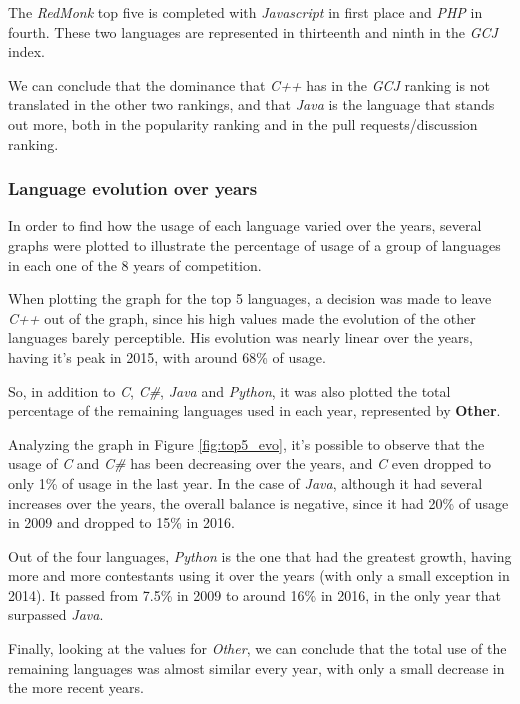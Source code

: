 \documentclass{article}
\begin{document}
\begin{multicols*}{2}
The \textit{RedMonk} top five is completed with \textit{Javascript} in first place and \textit{PHP} in fourth. These two languages are represented in thirteenth and ninth in the \textit{GCJ} index.

We can conclude that the dominance that \textit{C++} has in the \textit{GCJ} ranking is not translated in the other two rankings, and that \textit{Java} is the language that stands out more, both in the popularity ranking and in the pull requests/discussion ranking.


\subsubsection{Language evolution over years}

In order to find how the usage of each language varied over the years, several graphs were plotted to illustrate the percentage of usage of a group of languages in each one of the 8 years of competition.

When plotting the graph for the top 5 languages, a decision was made to leave \textit{C++} out of the graph, since his high values made the evolution of the other languages barely perceptible. His evolution was nearly linear over the years, having it's peak in 2015, with around 68\% of usage.

So, in addition to \textit{C}, \textit{C\#}, \textit{Java} and \textit{Python}, it was also plotted the total percentage of the remaining languages used in each year, represented by \textbf{Other}.

Analyzing the graph in Figure \ref{fig:top5_evo}, it's possible to observe that the usage of \textit{C} and \textit{C\#} has been decreasing over the years, and \textit{C} even dropped to only 1\% of usage in the last year.
In the case of \textit{Java}, although it had several increases over the years, the overall balance is negative, since it had 20\% of usage in 2009 and dropped to 15\% in 2016.

Out of the four languages, \textit{Python} is the one that had the greatest growth, having more and more contestants using it over the years (with only a small exception in 2014). It passed from 7.5\% in 2009 to around 16\% in 2016, in the only year that surpassed \textit{Java}.

Finally, looking at the values for \textit{Other}, we can conclude that the total use of the remaining languages was almost similar every year, with only a small decrease in the more recent years.


\end{multicols*}
\end{document}
